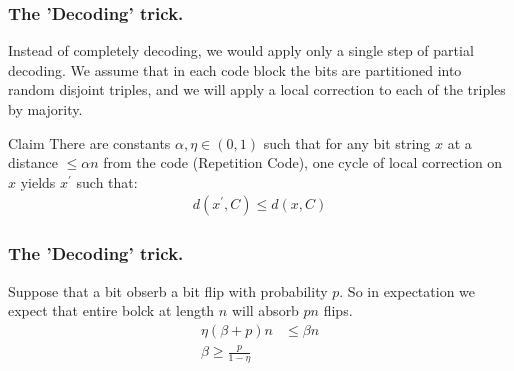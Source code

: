 \documentclass{beamer}
\begin{document}
\begin{frame}
  \frametitle{The 'Decoding' trick.} 

Instead of completely decoding, we would apply only a single step of partial decoding. We assume that in each code block the bits are partitioned into random disjoint triples, and we will apply a local correction to each of the triples by majority.



\begin{block}{Claim}
There are constants $\alpha, \eta \in (0,1)$ such that for any bit string $x$ at a distance $\le \alpha n$ from the code (Repetition Code), one cycle of local correction on $x$ yields $x^\prime$ such that:
  \begin{equation*}
    \begin{split}
      d(x^{\prime}, C) \le d(x, C)
    \end{split}
  \end{equation*}
\end{block}
\end{frame}


\begin{frame}
  \frametitle{The 'Decoding' trick.} 
  
  Suppose that a bit obserb a bit flip with probability $p$. So in expectation we expect that entire bolck at length $n$ will absorb $pn$ flips.  
  \begin{equation*}
    \begin{split}
      \eta \left( \beta + p  \right) n &\le \beta n \\ 
      \beta \ge \frac{p}{ 1 - \eta}
    \end{split}
  \end{equation*}


\end{frame}
\end{document}
